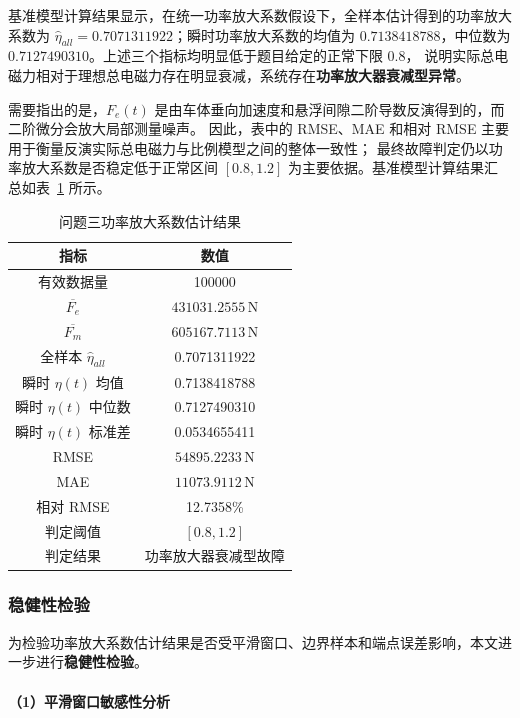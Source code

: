\documentclass[a4paper]{nmmcm}
\begin{document}
基准模型计算结果显示，在统一功率放大系数假设下，全样本估计得到的功率放大系数为
$\hat{\eta}_{all}=0.7071311922$；瞬时功率放大系数的均值为
$0.7138418788$，中位数为 $0.7127490310$。上述三个指标均明显低于题目给定的正常下限 $0.8$，
说明实际总电磁力相对于理想总电磁力存在明显衰减，系统存在\textbf{功率放大器衰减型异常}。

需要指出的是，$F_e(t)$ 是由车体垂向加速度和悬浮间隙二阶导数反演得到的，而二阶微分会放大局部测量噪声。
因此，表中的 RMSE、MAE 和相对 RMSE 主要用于衡量反演实际总电磁力与比例模型之间的整体一致性；
最终故障判定仍以功率放大系数是否稳定低于正常区间 $[0.8,1.2]$ 为主要依据。基准模型计算结果汇总如表~\ref{tab:problem3_result} 所示。

\FloatBarrier
\begin{table}[H]
\centering
\caption{问题三功率放大系数估计结果}
\label{tab:problem3_result}
\begin{tabular}{c c}
\hline
指标 & 数值 \\
\hline
有效数据量 & 100000 \\
$\overline{F_e}$ & $431031.2555\,\mathrm{N}$ \\
$\overline{F_m}$ & $605167.7113\,\mathrm{N}$ \\
全样本 $\hat{\eta}_{all}$ & 0.7071311922 \\
瞬时 $\eta(t)$ 均值 & 0.7138418788 \\
瞬时 $\eta(t)$ 中位数 & 0.7127490310 \\
瞬时 $\eta(t)$ 标准差 & 0.0534655411 \\
RMSE & $54895.2233\,\mathrm{N}$ \\
MAE & $11073.9112\,\mathrm{N}$ \\
相对 RMSE & 12.7358\% \\
判定阈值 & $[0.8,1.2]$ \\
判定结果 & 功率放大器衰减型故障 \\
\hline
\end{tabular}
\end{table}
\FloatBarrier

\subsubsection{稳健性检验}

为检验功率放大系数估计结果是否受平滑窗口、边界样本和端点误差影响，本文进一步进行\textbf{稳健性检验}。

\paragraph{（1）平滑窗口敏感性分析}
\end{document}
